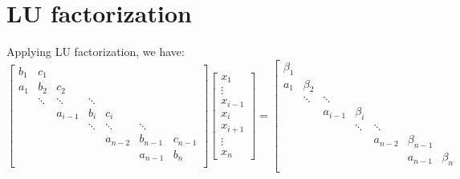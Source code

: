\documentclass[landscape]{article}
\begin{document}
\section{LU factorization}
Applying LU factorization, we have:
\[
\left[\begin{array}{ccccccccc}
b_{1} & c_{1}    &           &           &           &           &         \\
a_{1} & b_{2}    & c_{2}     &           &           &           &         \\
      & \ddots   & \ddots    & \ddots    &           &           &         \\
      &          & a_{i-1}   & b_{i}     & c_{i}     &           &         \\
      &          &           & \ddots    & \ddots    & \ddots    &         \\
      &          &           &           & a_{n-2}   & b_{n-1}   & c_{n-1} \\
      &          &           &           &           & a_{n-1}   & b_{n}   \\
\end{array} \right] 
\left[ \begin{array}{c}
x_{1} \\ \vdots \\ x_{i-1} \\ x_{i} \\ x_{i+1} \\ \vdots \\ x_{n}
\end{array} \right]
=
\left[\begin{array}{ccccccccc}
\beta_{1}  &               &              &              &              &             &           \\
a_{1}      & \beta_{2}     &              &              &              &             &           \\
           & \ddots        & \ddots       &              &              &             &           \\
           &               & a_{i-1}      & \beta_{i}    &              &             &           \\
           &               &              & \ddots       & \ddots       &             &           \\
           &               &              &              & a_{n-2}      & \beta_{n-1} &           \\
           &               &              &              &              & a_{n-1}     & \beta_{n} \\

\end{array}\]
\end{document}
